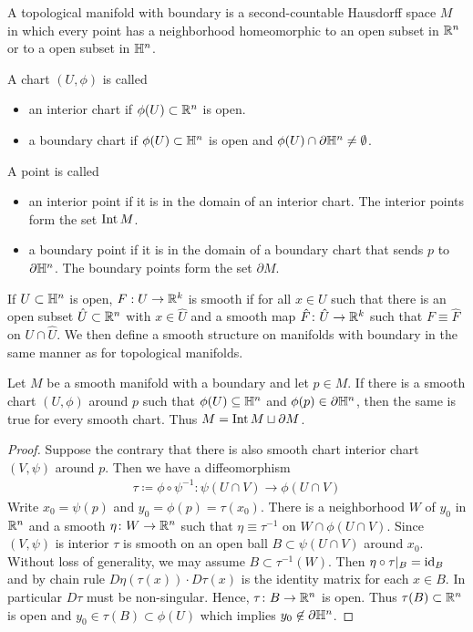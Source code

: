 \documentclass{skript}
\begin{document}
\begin{definition}\label{def:topmanfbound}
    A topological manifold with boundary is a second-countable Hausdorff space $M$ in which every point has a neighborhood homeomorphic to an open subset in $\mathbb{R}^n$ or to a open subset in $\mathbb{H}^n$.

A chart $(U,\phi)$ is called 
\begin{itemize}
    \item 
        an interior chart if $\phi(U) \subset \mathbb{R}^n$ is open.
    \item
        a boundary chart if $\phi(U)\subset \mathbb{H}^n$ is open and $\phi(U) \cap \partial\mathbb{H}^n \neq \emptyset$.
\end{itemize}
A point is called
\begin{itemize}
\item
    an interior point if it is in the domain of an interior chart. 
    The interior points form the set $\operatorname{Int} M$.
\item 
    a boundary point if it is in the domain of a boundary chart that sends $p$ to $\partial \mathbb{H}^n$. 
    The boundary points form the set $\partial M$.
\end{itemize}
If $U\subset \mathbb{H}^n$ is open, $F:U\to \mathbb{R}^k$ is smooth if for all $x\in U$ such that there is an open subset $\hat U\subset \mathbb{R}^n$ with $x\in \hat U$ and a smooth map $\hat F\colon \hat U \to \mathbb{R}^k$ such that $F\equiv \hat F$ on $U\cap \hat U$.
We then define a smooth structure on manifolds with boundary in the same manner as for topological manifolds.

\begin{thm}
    Let $M$ be a smooth manifold with a boundary and let $p\in M$. 
    If there is a smooth chart $(U, \phi)$ around $p$ such that $\phi(U) \subseteq \mathbb{H}^n$ and $\phi(p) \in \partial\mathbb{H}^n$, then the same is true for every smooth chart.
    Thus $M= \operatorname{Int} M \sqcup \partial M$.
\end{thm}
\begin{proof}
    Suppose the contrary that there is also smooth chart interior chart $(V,\psi)$ around $p$.
    Then we have a diffeomorphism 
    \begin{align*}
        \tau \coloneqq \phi\circ \psi^{-1} \colon \psi(U\cap V) \longrightarrow \phi(U\cap V)
    \end{align*}
    Write $x_0 = \psi(p)$ and $y_0 = \phi(p) = \tau(x_0)$. 
    There is a neighborhood $W$ of $y_0$ in $\mathbb{R}^n$ and a smooth $\eta\colon W\to \mathbb{R}^n$ such that $\eta \equiv \tau^{-1}$ on $W\cap \phi(U\cap V)$. 
    Since $(V,\psi)$ is interior $\tau$ is smooth on an open ball $B\subset \psi(U\cap V)$ around $x_0$.
    Without loss of generality, we may assume $B\subset \tau^{-1} (W)$. 
    Then $\eta\circ \tau|_B = \mathrm{id}_B$ and by chain rule $D\eta(\tau(x)) \cdot D\tau(x)$ is the identity matrix for each $x\in B$.
    In particular $D\tau$ must be non-singular.
    Hence, $\tau \colon B\to \mathbb{R}^n$ is open.
    Thus $\tau(B)\subset \mathbb{R}^n$ is open and $y_0\in \tau(B)\subset \phi(U)$ which implies $y_0\not\in \partial \mathbb{H}^n$. 
\end{proof}

\end{definition}
\end{document}
